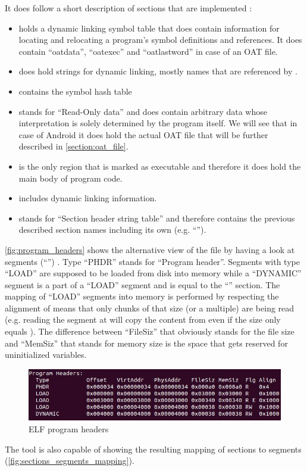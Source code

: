 It does follow a short description of sections that are implemented
\parencite{life_of_binaries}:
\begin{itemize}
    \item {} holds a dynamic linking symbol table that
    does contain information for locating and relocating a program's
    symbol definitions and references. It does contain ``oatdata'',
    ``oatexec'' and ``oatlastword'' in case of an OAT file.
    \item {} does hold strings for dynamic linking,
    mostly names that are referenced by .
    \item {} contains the symbol hash table
    \item {} stands for ``Read-Only data'' and does
    contain arbitrary data whose interpretation is solely
    determined by the program itself. We will
    see that in case of Android it does hold the actual OAT file
    that will be further described in \autoref{section:oat_file}.
    \item {} is the only region that is marked as
    executable and therefore it does hold the main body of
    program code.
    \item {} includes dynamic linking information.
    \item {} stands for ``Section header string
    table'' and therefore contains the previous described
    section names including its own (e.g. ``'').
\end{itemize}

\autoref{fig:program_headers} shows the alternative view of the
file by having a look at segments (``'')
. Type ``PHDR'' stands for ``Program header''. Segments with type
``LOAD'' are supposed to be loaded from disk into memory while
a ``DYNAMIC'' segment is a part of a ``LOAD'' segment and is equal
to the ``'' section. The mapping of ``LOAD'' segments
into memory is performed by respecting the alignment of 
means that only chunks of that size (or a multiple) are being read
(e.g. reading the segment at  will copy the content
from  even if the size only equals ).
The difference between ``FileSiz'' that obviously stands for the file
size and ``MemSiz'' that stands for memory size is the space that
gets reserved for uninitialized variables.
\begin{figure}[htb]
  \centering
  \includegraphics[width=\textwidth]{figures/android_elf_program_headers}
  \caption[ELF program headers]{ELF program headers}
  \label{fig:program_headers}
\end{figure}
The  tool is also capable of showing the resulting
mapping of sections to segments
(\autoref{fig:sections_segments_mapping}).

